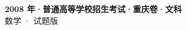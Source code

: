 \documentclass[zihao=-4, a4paper]{ctexart}
\begin{document}
\begin{center}
  {\Large\bfseries 2008 年·普通高等学校招生考试·重庆卷·文科}\\[4pt]
  {\large 数学 · 试题版}
\end{center}
\medskip
{}

\end{document}
